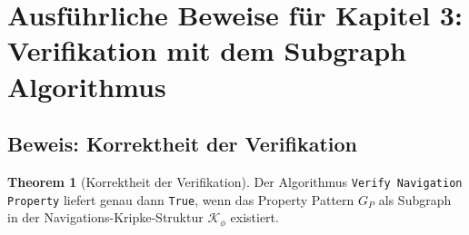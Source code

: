 ﻿\documentclass[a4paper,12pt]{article}
\theoremstyle{definition}
\newtheorem{theorem}{Theorem}[section]
\begin{document}
\newpage

\section{Ausführliche Beweise für Kapitel 3: Verifikation mit dem Subgraph Algorithmus}

\subsection{Beweis: Korrektheit der Verifikation}

\begin{theorem}[Korrektheit der Verifikation]
Der Algorithmus \texttt{Verify Navigation Property} liefert genau dann \texttt{True}, wenn das Property Pattern $G_P$ als Subgraph in der Navigations-Kripke-Struktur $\mathcal{K}_{\phi}$ existiert.
\end{theorem}
\end{document}
